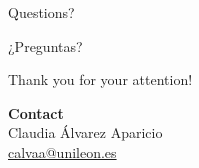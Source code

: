 \begin{frame}{Questions?}
    \begin{center}
        \Huge{¿Preguntas?}

        \vspace{1cm}

        \Large{Thank you for your attention!}

        \vspace{1cm}

        \normalsize
        \textbf{Contact}\\
        Claudia Álvarez Aparicio\\
        \url{calvaa@unileon.es}
    \end{center}
\end{frame}
